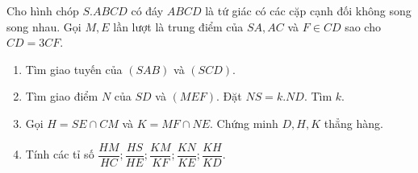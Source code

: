 \begin{bt}
\begin{bt}%
	Cho hình chóp $S.ABCD$ có đáy $ABCD$ là tứ giác có các cặp cạnh đối không song song nhau. Gọi $M, E$ lần lượt là trung điểm của $SA, AC$ và $F \in CD$ sao cho $CD=3CF$.
	\begin{enumerate}
		\item Tìm giao tuyến của $(SAB)$ và $(SCD)$.
		\item Tìm giao điểm $N$ của $SD$ và $(MEF)$. Đặt $NS=k.ND$. Tìm $k$.
		\item Gọi $H=SE \cap CM$ và $K=MF \cap NE$. Chứng minh $D, H, K$ thẳng hàng.
		\item Tính các tỉ số $\dfrac{HM}{HC}; \dfrac{HS}{HE}; \dfrac{KM}{KF}; \dfrac{KN}{KE}; \dfrac{KH}{KD}$.
	\end{enumerate}
\end{bt}
\end{bt}
